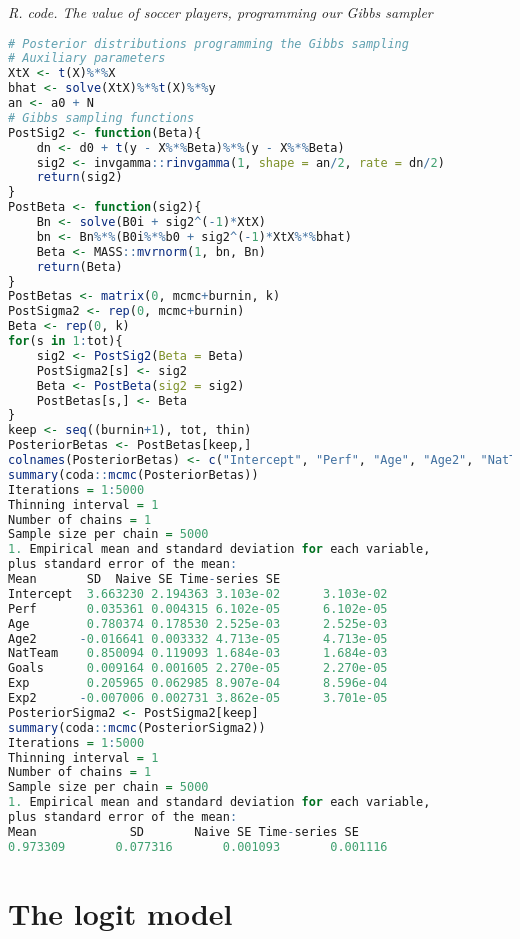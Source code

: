 \begin{tcolorbox}[enhanced,width=4.67in,center upper,
	fontupper=\large\bfseries,drop shadow southwest,sharp corners]
	\textit{R. code. The value of soccer players, programming our Gibbs sampler}
	\begin{VF}
		\begin{lstlisting}[language=R]		
# Posterior distributions programming the Gibbs sampling
# Auxiliary parameters
XtX <- t(X)%*%X
bhat <- solve(XtX)%*%t(X)%*%y
an <- a0 + N
# Gibbs sampling functions
PostSig2 <- function(Beta){
	dn <- d0 + t(y - X%*%Beta)%*%(y - X%*%Beta)
	sig2 <- invgamma::rinvgamma(1, shape = an/2, rate = dn/2)
	return(sig2)
}
PostBeta <- function(sig2){
	Bn <- solve(B0i + sig2^(-1)*XtX)
	bn <- Bn%*%(B0i%*%b0 + sig2^(-1)*XtX%*%bhat)
	Beta <- MASS::mvrnorm(1, bn, Bn)
	return(Beta)
}
PostBetas <- matrix(0, mcmc+burnin, k)
PostSigma2 <- rep(0, mcmc+burnin)
Beta <- rep(0, k)
for(s in 1:tot){
	sig2 <- PostSig2(Beta = Beta)
	PostSigma2[s] <- sig2
	Beta <- PostBeta(sig2 = sig2)
	PostBetas[s,] <- Beta
}
keep <- seq((burnin+1), tot, thin)
PosteriorBetas <- PostBetas[keep,]
colnames(PosteriorBetas) <- c("Intercept", "Perf", "Age", "Age2", "NatTeam", "Goals", "Exp", "Exp2")
summary(coda::mcmc(PosteriorBetas))
Iterations = 1:5000
Thinning interval = 1 
Number of chains = 1 
Sample size per chain = 5000 
1. Empirical mean and standard deviation for each variable,
plus standard error of the mean:
Mean       SD  Naive SE Time-series SE
Intercept  3.663230 2.194363 3.103e-02      3.103e-02
Perf       0.035361 0.004315 6.102e-05      6.102e-05
Age        0.780374 0.178530 2.525e-03      2.525e-03
Age2      -0.016641 0.003332 4.713e-05      4.713e-05
NatTeam    0.850094 0.119093 1.684e-03      1.684e-03
Goals      0.009164 0.001605 2.270e-05      2.270e-05
Exp        0.205965 0.062985 8.907e-04      8.596e-04
Exp2      -0.007006 0.002731 3.862e-05      3.701e-05
PosteriorSigma2 <- PostSigma2[keep]
summary(coda::mcmc(PosteriorSigma2))
Iterations = 1:5000
Thinning interval = 1 
Number of chains = 1 
Sample size per chain = 5000 
1. Empirical mean and standard deviation for each variable,
plus standard error of the mean:
Mean             SD       Naive SE Time-series SE 
0.973309       0.077316       0.001093       0.001116 
\end{lstlisting}
	\end{VF}
\end{tcolorbox} 

\section{The logit model}\label{sec62}

